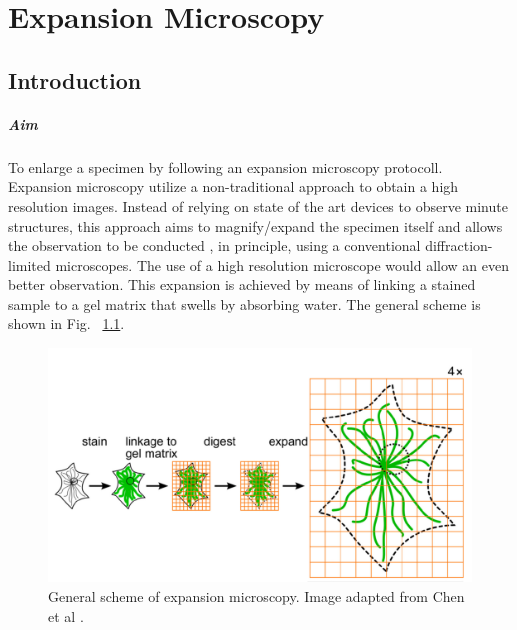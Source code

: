 
\chapter{Expansion Microscopy}
\label{chp:Expansion}

\section{Introduction}

\paragraph{Aim} To enlarge a specimen by following an expansion microscopy protocoll.
\\

Expansion microscopy utilize a non-traditional approach to obtain a high resolution images. 
Instead of relying on state of the art devices to observe minute structures, this approach aims to magnify/expand the specimen itself and allows the observation to be conducted , in principle, using a conventional diffraction-limited microscopes. 
The use of a high resolution microscope would allow an even better observation. 
This expansion is achieved by means of linking a stained sample to a gel matrix that swells by absorbing water. 
The general scheme is shown in Fig. ~\ref{fig:exmgensch}.

\begin{figure}[h!]
\centering
\includegraphics[width=.5\columnwidth]{Exp_5_Expansion/Figures/genscheme}
\caption{General scheme of expansion microscopy. Image adapted from Chen et al \cite{Chen2015}.} 
\label{fig:exmgensch}
\end{figure}
